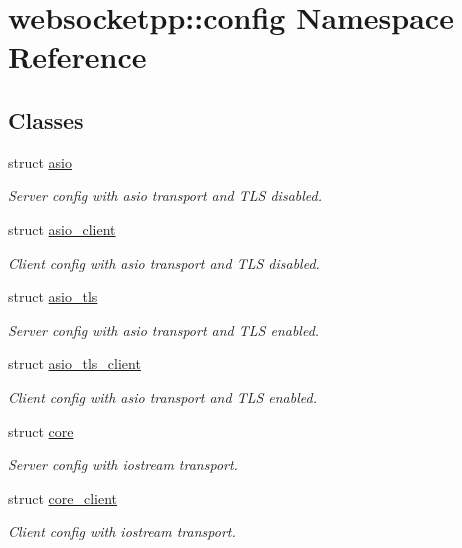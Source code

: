 \hypertarget{namespacewebsocketpp_1_1config}{}\section{websocketpp\+:\+:config Namespace Reference}
\label{namespacewebsocketpp_1_1config}
\subsection*{Classes}
\begin{DoxyCompactItemize}
\item 
struct \hyperlink{structwebsocketpp_1_1config_1_1asio}{asio}
\begin{DoxyCompactList}\small\item\em Server config with asio transport and T\+L\+S disabled. \end{DoxyCompactList}\item 
struct \hyperlink{structwebsocketpp_1_1config_1_1asio__client}{asio\+\_\+client}
\begin{DoxyCompactList}\small\item\em Client config with asio transport and T\+L\+S disabled. \end{DoxyCompactList}\item 
struct \hyperlink{structwebsocketpp_1_1config_1_1asio__tls}{asio\+\_\+tls}
\begin{DoxyCompactList}\small\item\em Server config with asio transport and T\+L\+S enabled. \end{DoxyCompactList}\item 
struct \hyperlink{structwebsocketpp_1_1config_1_1asio__tls__client}{asio\+\_\+tls\+\_\+client}
\begin{DoxyCompactList}\small\item\em Client config with asio transport and T\+L\+S enabled. \end{DoxyCompactList}\item 
struct \hyperlink{structwebsocketpp_1_1config_1_1core}{core}
\begin{DoxyCompactList}\small\item\em Server config with iostream transport. \end{DoxyCompactList}\item 
struct \hyperlink{structwebsocketpp_1_1config_1_1core__client}{core\+\_\+client}
\begin{DoxyCompactList}\small\item\em Client config with iostream transport. \end{DoxyCompactList}\item 

\end{DoxyCompactItemize}
